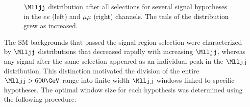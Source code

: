 \begin{figure}[btp]
	\centering
	\label{fig:signalShapesAfterSelection}
	\caption{$\Mlljj$ distribution after all selections for several \WR signal hypotheses in the $ee$ (left) and $\mu\mu$ (right) 
		channels.  The tails of the distribution grew as \mWR increased.}
\end{figure}

The SM backgrounds that passed the signal region selection were characterized by $\Mlljj$ 
distributions that decreased rapidly with increasing $\Mlljj$, whereas any \WR signal 
after the same selection appeared as an individual peak in the $\Mlljj$ distribution.  
This distinction motivated the division of the entire $\Mlljj > 600\GeV$ range into finite 
width $\Mlljj$ windows linked to specific \mWR hypotheses.  The optimal window size for each 
\mWR hypothesis was determined using the following procedure:

